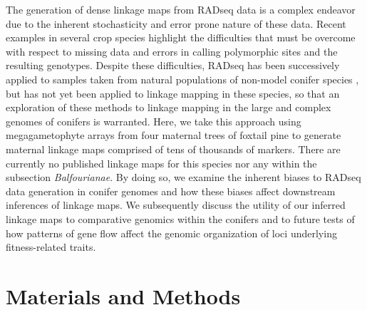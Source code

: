 \documentclass[11pt]{article}
\begin{document}
The generation of dense linkage maps from RADseq data is a complex endeavor due to the inherent stochasticity
and error prone nature of these data. Recent examples in several crop species highlight the
difficulties that must be overcome with respect to missing data and errors in calling polymorphic sites 
and the resulting genotypes\citep{Pfender:2011, Ward:2013}. Despite these difficulties, RADseq has been 
successively applied to samples taken from natural populations of non-model conifer species \citep{Parchman:2012}, but has not yet 
been applied to linkage mapping in these species, so that an exploration of these methods to linkage mapping in the large and complex 
genomes of conifers is warranted. Here, we take this approach using megagametophyte arrays from four maternal trees of foxtail pine
to generate maternal linkage maps comprised of tens of thousands of markers. There are currently no published linkage 
maps for this species nor any within the subsection \textit{Balfourianae}. By doing so, we examine the inherent biases
to RADseq data generation in conifer genomes and how these biases affect downstream inferences of linkage maps. We subsequently discuss
the utility of our inferred linkage maps to comparative genomics within the conifers and to future tests of how patterns of gene flow 
affect the genomic organization of loci underlying fitness-related traits.


\section*{Materials and Methods}
\end{document}
